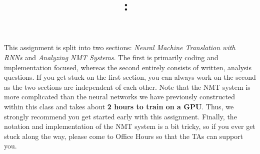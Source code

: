 \documentclass[answers]{exam}
\title{
\vspace{-1in}
\textmd{\textbf{\hmwkClass:\ \hmwkTitle} \\ \hmwkAuthorName}
}
\author{}
\date{}
\begin{document}
\maketitle
\vspace{-.5in}


This assignment is split into two sections: \textit{Neural Machine Translation with RNNs} and \textit{Analyzing NMT Systems}. The first is primarily coding and implementation focused, whereas the second entirely consists of written, analysis questions. If you get stuck on the first section, you can always work on the second as the two sections are independent of each other. Note that the NMT system is more complicated than the neural networks we have previously constructed within this class and takes about \textbf{2 hours to train on a GPU}. Thus, we strongly recommend you get started early with this assignment. Finally, the notation and implementation of the NMT system is a bit tricky, so if you ever get stuck along the way, please come to Office Hours so that the TAs can support you. \newline

\begin{questions}
    
    
\end{questions}


\end{document}
